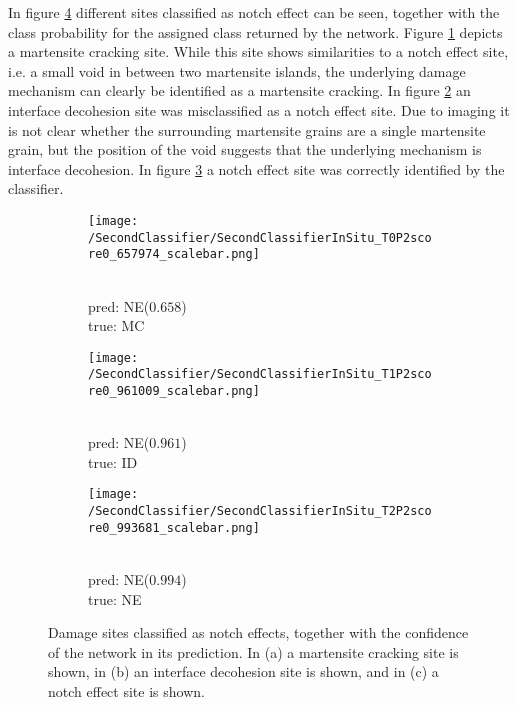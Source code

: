 In figure \ref{fig:InSituNotchEffectSamples} different sites classified as notch effect can be seen, together with the class probability for the assigned class returned by the network. Figure \ref{sub:InSituNotchEffectSamplesM} depicts a martensite cracking site. While this site shows similarities to a notch effect site, i.e. a small void in between two martensite islands, the underlying damage mechanism can clearly be identified as a martensite cracking. In figure \ref{sub:InSituNotchEffectSamplesI} an interface decohesion site was misclassified as a notch effect site. Due to imaging it is not clear whether the surrounding martensite grains are a single martensite grain, but the position of the void suggests that the underlying mechanism is interface decohesion. In figure \ref{sub:InSituNotchEffectSamplesN} a notch effect site was correctly identified by the classifier.

\begin{figure}[H]
\centering
\begin{subfigure}{0.3\textwidth}
\texttt{[image: /SecondClassifier/SecondClassifierInSitu\_T0P2score0\_657974\_scalebar.png]}
\caption{\\pred: NE($0.658$) \\ true: MC}
\label{sub:InSituNotchEffectSamplesM}
\end{subfigure}
\begin{subfigure}{0.3\textwidth}
\texttt{[image: /SecondClassifier/SecondClassifierInSitu\_T1P2score0\_961009\_scalebar.png]}
\caption{\\pred: NE($0.961$) \\ true: ID}
\label{sub:InSituNotchEffectSamplesI}
\end{subfigure}
\begin{subfigure}{0.3\textwidth}
\texttt{[image: /SecondClassifier/SecondClassifierInSitu\_T2P2score0\_993681\_scalebar.png]}
\caption{\\pred: NE($0.994$) \\ true: NE}
\label{sub:InSituNotchEffectSamplesN}
\end{subfigure}
\caption{Damage sites classified as notch effects, together with the confidence of the network in its prediction. In (a) a martensite cracking site is shown, in (b) an interface decohesion site is shown, and in (c) a notch effect site is shown. }
\label{fig:InSituNotchEffectSamples}
\end{figure}

